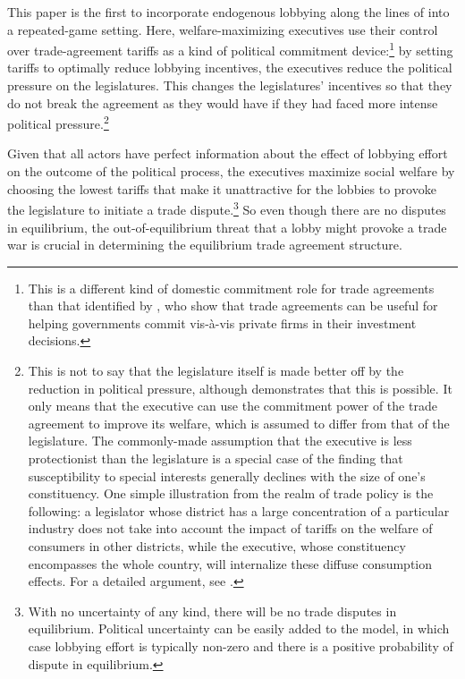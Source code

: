 \documentclass[authoryear, review]{elsarticle}
\begin{document}
This paper is the first to incorporate endogenous lobbying along the lines of \citet{gh94,gh95} into a repeated-game setting. Here, welfare-maximizing executives use their control over trade-agreement tariffs as a kind of political commitment device:\footnote{This is a different kind of domestic commitment role for trade agreements than that identified by \citet{mrc2007}, who show that trade agreements can be useful for helping governments commit vis-\`{a}-vis private firms in their investment decisions.} by setting tariffs to optimally reduce lobbying incentives, the executives reduce the political pressure on the legislatures. This changes the legislatures' incentives so that they do not break the agreement as they would have if they had faced more intense political pressure.\footnote{This is not to say that the legislature itself is made better off by the reduction in political pressure, although \citet{buzard2014} demonstrates that this is possible. It only means that the executive can use the commitment power of the trade agreement to improve its welfare, which is assumed to differ from that of the legislature. The commonly-made assumption that the executive is less protectionist than the legislature is a special case of the finding that susceptibility to special interests generally declines with the size of one's constituency. One simple illustration from the realm of trade policy is the following: a legislator whose district has a large concentration of a particular industry does not take into account the impact of tariffs on the welfare of consumers in other districts, while the executive, whose constituency encompasses the whole country, will internalize these diffuse consumption effects. For a detailed argument, see \citet{lohohal}.\label{fn:ga_l_e3}}

Given that all actors have perfect information about the effect of lobbying effort on the outcome of the political process, the executives maximize social welfare by choosing the lowest tariffs that make it unattractive for the lobbies to provoke the legislature to initiate a trade dispute.\footnote{With no uncertainty of any kind, there will be no trade disputes in equilibrium. Political uncertainty can be easily added to the model, in which case lobbying effort is typically non-zero and there is a positive probability of dispute in equilibrium.} So even though there are no disputes in equilibrium, the out-of-equilibrium threat that a lobby might provoke a trade war is crucial in determining the equilibrium trade agreement structure.
\end{document}
